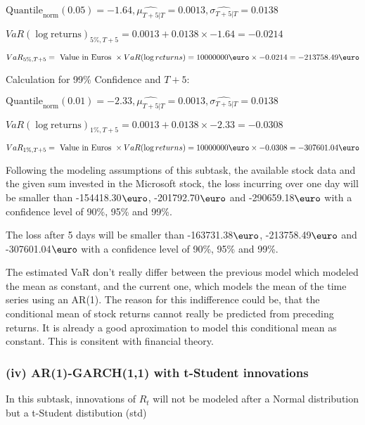 \indent\indent $\text{Quantile}_\text{norm}(0.05) = -1.64,\hat{\mu_{T+5|T}} = 0.0013, \hat{\sigma_{T+5|T}} = 0.0138$

\indent\indent $VaR(\log \text{returns})_{5\%, T + 5} = 0.0013 + 0.0138\times-1.64 = -0.0214$

\indent\indent $VaR_{5\%, T + 5} = \text{ Value in Euros } \times VaR(\log returns) = 10 000 000 \text{\euro} \times-0.0214 = -213758.49 \text{\euro}$\newline




Calculation for 99\% Confidence and $T+5$:

\indent\indent $\text{Quantile}_\text{norm}(0.01) = -2.33,\hat{\mu_{T+5|T}} = 0.0013, \hat{\sigma_{T+5|T}} = 0.0138$

\indent\indent $VaR(\log \text{returns})_{1\%, T + 5} = 0.0013 + 0.0138\times-2.33 = -0.0308$

\indent\indent $VaR_{1\%, T + 5} = \text{ Value in Euros } \times VaR(\log returns) = 10 000 000 \text{\euro} \times-0.0308 = -307601.04 \text{\euro}$\newline


Following the modeling assumptions of this subtask, the available stock data and the given sum invested in the Microsoft stock, the loss incurring over one day will be smaller than -154418.30$\text{\euro}$, -201792.70$\text{\euro}$  and -290659.18$\text{\euro}$  with a confidence level of 90\%, 95\%  and 99\%.

The loss after 5 days will be smaller than -163731.38$\text{\euro}$, -213758.49$\text{\euro}$  and -307601.04$\text{\euro}$  with a confidence level of 90\%, 95\%  and 99\%.

The estimated VaR don't really differ between the previous model which modeled the mean as constant, and the current one, which models the mean of the time series using an AR(1). 
The reason for this indifference could be, that the conditional mean of stock returns cannot really be predicted from preceding returns. It is already a good aproximation to model this conditional mean as constant. This is consitent with financial theory.

\subsubsection{(iv) AR(1)-GARCH(1,1) with t-Student innovations}
In this subtask, innovations of $R_t$ will not be modeled after a Normal distribution but a t-Student distibution (std) 

